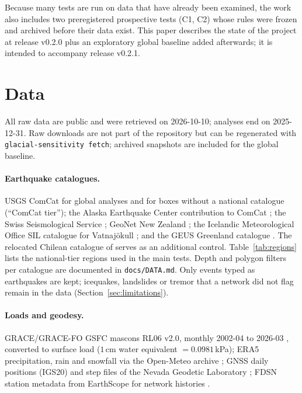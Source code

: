 \documentclass[11pt,a4paper]{article}
\begin{document}
Because many tests are run on data that have already been examined, the work also includes two preregistered prospective tests (C1, C2) whose rules were frozen and archived before their data exist. This paper describes the state of the project at release v0.2.0 \parencite{roemer2026v020} plus an exploratory global baseline added afterwards; it is intended to accompany release v0.2.1.

\section{Data}
\label{sec:data}

All raw data are public and were retrieved on 2026-10-10; analyses end on 2025-12-31. Raw downloads are not part of the repository but can be regenerated with \texttt{glacial-sensitivity fetch}; archived snapshots are included for the global baseline.

\paragraph{Earthquake catalogues.}
USGS ComCat \parencite{comcat} for global analyses and for boxes without a national catalogue (``ComCat tier''); the Alaska Earthquake Center contribution to ComCat \parencite[\texttt{catalog=ak};][]{aec}; the Swiss Seismological Service \parencite{sed}; GeoNet New Zealand \parencite{geonet}; the Icelandic Meteorological Office SIL catalogue for Vatnaj\"okull \parencite{imo}; and the GEUS Greenland catalogue \parencite{geus}. The relocated Chilean catalogue of \textcite{potin2024} \parencite[data:][]{potin2024data} serves as an additional control. Table~\ref{tab:regions} lists the national-tier regions used in the main tests. Depth and polygon filters per catalogue are documented in \texttt{docs/DATA.md}. Only events typed as earthquakes are kept; icequakes, landslides or tremor that a network did not flag remain in the data (Section~\ref{sec:limitations}).

\paragraph{Loads and geodesy.}
GRACE/GRACE-FO GSFC mascons RL06 v2.0, monthly 2002-04 to 2026-03 \parencite{gsfcmascons,loomis2019}, converted to surface load ($1$\,cm water equivalent $=0.0981$\,kPa); ERA5 precipitation, rain and snowfall via the Open-Meteo archive \parencite{openmeteo,hersbach2020}; GNSS daily positions (IGS20) and step files of the Nevada Geodetic Laboratory \parencite{ngl,blewitt2018}; FDSN station metadata from EarthScope for network histories \parencite{earthscope}.
\end{document}
